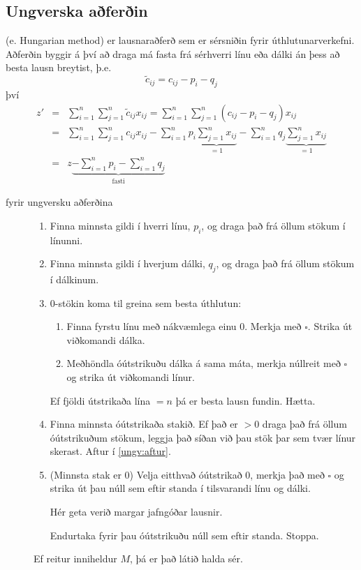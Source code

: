 \subsection{Ungverska aðferðin}
 (e. Hungarian method) er lausnaraðferð sem er sérsniðin fyrir úthlutunarverkefni. Aðferðin byggir á því að draga má fasta frá sérhverri línu eða dálki án þess að besta lausn breytist, þ.e. 
$$\tilde{c}_{ij}=c_{ij}-p_i-q_j$$
því 
\begin{eqnarray*}
 z'&=& \sum_{i=1}^n\sum_{j=1}^n\tilde{c}_{ij}x_{ij}=\sum_{i=1}^n\sum_{j=1}^n \left(c_{ij}-p_i-q_j\right)x_{ij}\\
 &=& \sum_{i=1}^n\sum_{j=1}^n c_{ij}x_{ij}-\sum_{i=1}^n p_i \underbrace{\sum_{j=1}^nx_{ij}}_{=1}-\sum_{i=1}^n q_j\underbrace{\sum_{j=1}^nx_{ij}}_{=1}\\
&=& z\underbrace{-\sum_{i=1}^n p_i -\sum_{i=1}^n q_j}_{\textrm{fasti}}
\end{eqnarray*}

\begin{samepage}
\begin{description}
 \item[ fyrir ungversku aðferðina]\hspace{.1cm}
 \begin{enumerate}[label=Skref \arabic{*}]
  \item Finna minnsta gildi í hverri línu, $p_i$,  og draga það frá öllum stökum í línunni.
  \item Finna minnsta gildi í hverjum dálki, $q_j$, og draga það frá öllum stökum í dálkinum.
  \item\label{ungv:aftur} $0$-stökin koma til greina sem besta úthlutun: 
 \begin{enumerate}
  \item Finna fyrstu línu með nákvæmlega einu $0$. Merkja með $\square$. Strika út viðkomandi dálka. 
  \item Meðhöndla óútstrikuðu dálka á sama máta, merkja núllreit með $\square$ og strika út viðkomandi línur.  
  \end{enumerate}
  Ef fjöldi útstrikaða lína $=n$ þá er besta lausn fundin. Hætta.
  \item Finna minnsta óútstrikaða stakið. Ef það er $>0$ draga það frá öllum óútstrikuðum stökum, leggja það síðan við þau stök þar sem tvær línur skerast. Aftur í \ref{ungv:aftur}.
  \item (Minnsta stak er 0) Velja eitthvað óútstrikað 0, merkja það með $\square$ og strika út þau núll sem eftir standa í tilsvarandi línu og dálki. \begin{aths}Hér geta verið margar jafngóðar lausnir.\end{aths} Endurtaka fyrir þau óútstrikuðu núll sem eftir standa. Stoppa.
 \end{enumerate}
\begin{aths} Ef reitur inniheldur $M$, þá er það látið halda sér.\end{aths}
\end{description}
\end{samepage}



